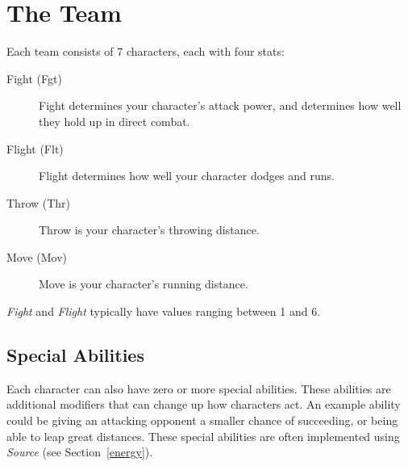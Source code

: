 \section{The Team} \label{the-team}
Each team consists of 7 characters, each with four stats:

\begin{description}
    \item[Fight (Fgt)] Fight determines your character's attack power, and determines how well they hold up in direct combat.
    \item[Flight (Flt)] Flight determines how well your character dodges and runs.
    \item[Throw (Thr)] Throw is your character's throwing distance.
    \item[Move (Mov)] Move is your character's running distance.
\end{description}

\textit{Fight} and \textit{Flight} typically have values ranging between 1 and 6.

\subsection{Special Abilities}
Each character can also have zero or more special abilities.
These abilities are additional modifiers that can change up how characters act.
An example ability could be giving an attacking opponent a smaller chance of succeeding, or being able to leap great distances.
These special abilities are often implemented using \textit{Source} (see Section~\ref{energy}).
